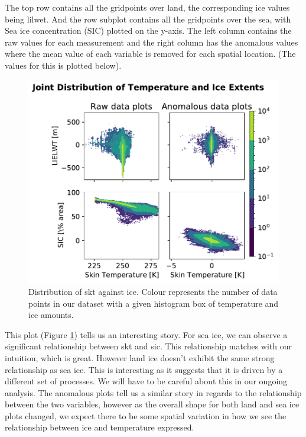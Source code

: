 \documentclass[../main.tex]{subfiles}
\begin{document}
The top row contains all the gridpoints over land, the corresponding ice values being \gls{lilwet}. And the row subplot contains all the gridpoints over the sea, with Sea ice concentration (SIC) plotted on the y-axis. The left column contains the raw values for each measurement and the right column has the anomalous values where the mean value of each variable is removed for each spatial location. (The values for this is plotted below).
\begin{figure}[ht!]
    \centering
    \includegraphics{images/week8/hres/distribution_of_temperature_ice_both_raw_and_anomalous}
    \caption{Distribution of \gls{skt} against ice. Colour represents the number of data points in our dataset with a given histogram box of temperature and ice amounts.}
    \label{fig:joint_distribuition_temp_ice}
\end{figure}

This plot (Figure \ref{fig:joint_distribuition_temp_ice}) tells us an interesting story. For sea ice, we can observe a significant relationship between \gls{skt} and \gls{sic}. This relationship matches with our intuition, which is great. However land ice doesn't exhibit the same strong relationship as sea ice. This is interesting as it suggests that it is driven by a different set of processes. We will have to be careful about this in our ongoing analysis. The anomalous plots tell us a similar story in regards to the relationship between the two variables, however as the overall shape for both land and sea ice plots changed, we expect there to be some spatial variation in how we see the relationship between ice and temperature expressed.
\end{document}
